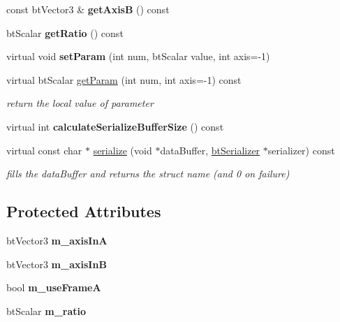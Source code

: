 \begin{DoxyCompactItemize}
const bt\+Vector3 \& {\bfseries get\+AxisB} () const
\item 
\mbox{\label{classbtGearConstraint_aff98bc6ffbe12a3095be1a7d3e2afa67}} 
bt\+Scalar {\bfseries get\+Ratio} () const
\item 
\mbox{\label{classbtGearConstraint_a5fb040e6b923ec5d4a735cf0953a421a}} 
virtual void {\bfseries set\+Param} (int num, bt\+Scalar value, int axis=-\/1)
\item 
\mbox{\label{classbtGearConstraint_a522a5cd09cecc3ffae11e24019f07178}} 
virtual bt\+Scalar \hyperlink{classbtGearConstraint_a522a5cd09cecc3ffae11e24019f07178}{get\+Param} (int num, int axis=-\/1) const
\begin{DoxyCompactList}\small\item\em return the local value of parameter \end{DoxyCompactList}\item 
\mbox{\label{classbtGearConstraint_a42182017d77b1da4d09879a924ee03f1}} 
virtual int {\bfseries calculate\+Serialize\+Buffer\+Size} () const
\item 
\mbox{\label{classbtGearConstraint_a32c7a6c67faab5ef15488950d3d3e07e}} 
virtual const char $\ast$ \hyperlink{classbtGearConstraint_a32c7a6c67faab5ef15488950d3d3e07e}{serialize} (void $\ast$data\+Buffer, \hyperlink{classbtSerializer}{bt\+Serializer} $\ast$serializer) const
\begin{DoxyCompactList}\small\item\em fills the data\+Buffer and returns the struct name (and 0 on failure) \end{DoxyCompactList}\end{DoxyCompactItemize}
\subsection*{Protected Attributes}
\begin{DoxyCompactItemize}
\item 
\mbox{\label{classbtGearConstraint_acff9277f36d0e72e88d47f608adfa2d7}} 
bt\+Vector3 {\bfseries m\+\_\+axis\+InA}
\item 
\mbox{\label{classbtGearConstraint_a64c06b83340574c1fcc3be1a09ce3de1}} 
bt\+Vector3 {\bfseries m\+\_\+axis\+InB}
\item 
\mbox{\label{classbtGearConstraint_a1c3cf937feefba932336972a5a62dbc6}} 
bool {\bfseries m\+\_\+use\+FrameA}
\item 
\mbox{\label{classbtGearConstraint_a4fd812c772ec474962d6e7534b807613}} 
bt\+Scalar {\bfseries m\+\_\+ratio}
\end{DoxyCompactItemize}


